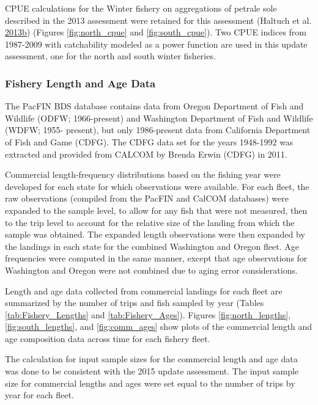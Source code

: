 \documentclass[12pt,]{article}
\begin{document}
CPUE calculations for the Winter fishery on aggregations of petrale sole
described in the 2013 assessment were retained for this assessment
(Haltuch et al.
\protect\hyperlink{ref-haltuch_status_2013}{2013}\protect\hyperlink{ref-haltuch_status_2013}{b})
(Figures \ref{fig:north_cpue} and \ref{fig:south_cpue}). Two CPUE
indices from 1987-2009 with catchability modeled as a power function are
used in this update assessment, one for the north and south winter
fisheries.

\subsubsection{Fishery Length and Age
Data}\label{fishery-length-and-age-data}

The PacFIN BDS database contains data from Oregon Department of Fish and
Wildlife (ODFW; 1966-present) and Washington Department of Fish and
Wildlife (WDFW; 1955- present), but only 1986-present data from
California Department of Fish and Game (CDFG). The CDFG data set for the
years 1948-1992 was extracted and provided from CALCOM by Brenda Erwin
(CDFG) in 2011.

Commercial length-frequency distributions based on the fishing year were
developed for each state for which observations were available. For each
fleet, the raw observations (compiled from the PacFIN and CalCOM
databases) were expanded to the sample level, to allow for any fish that
were not measured, then to the trip level to account for the relative
size of the landing from which the sample was obtained. The expanded
length observations were then expanded by the landings in each state for
the combined Washington and Oregon fleet. Age frequencies were computed
in the same manner, except that age observations for Washington and
Oregon were not combined due to aging error considerations.

Length and age data collected from commercial landings for each fleet
are summarized by the number of trips and fish sampled by year (Tables
\ref{tab:Fishery_Lengths} and \ref{tab:Fishery_Ages}). Figures
\ref{fig:north_lengths}, \ref{fig:south_lengths}, and
\ref{fig:comm_ages} show plots of the commercial length and age
composition data across time for each fishery fleet.

The calculation for input sample sizes for the commercial length and age
data was done to be consistent with the 2015 update assessment. The
input sample size for commercial lengths and ages were set equal to the
number of trips by year for each fleet.
\end{document}
